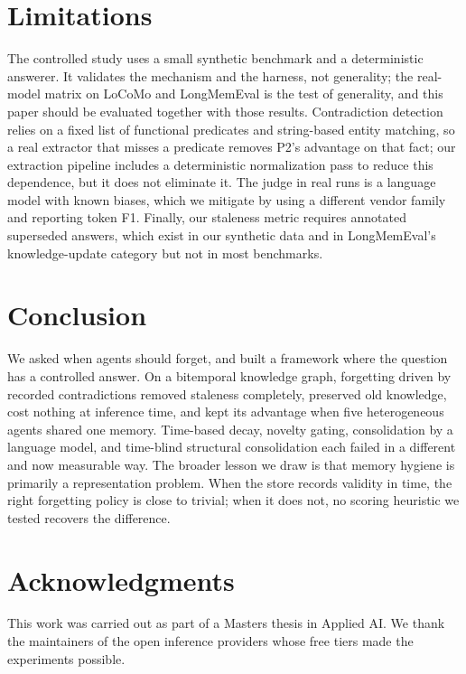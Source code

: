 \documentclass[letterpaper]{article} %
\begin{document}
\section{Limitations}

The controlled study uses a small synthetic benchmark and a deterministic answerer. It validates the mechanism and the harness, not generality; the real-model matrix on LoCoMo and LongMemEval is the test of generality, and this paper should be evaluated together with those results. Contradiction detection relies on a fixed list of functional predicates and string-based entity matching, so a real extractor that misses a predicate removes P2's advantage on that fact; our extraction pipeline includes a deterministic normalization pass to reduce this dependence, but it does not eliminate it. The judge in real runs is a language model with known biases, which we mitigate by using a different vendor family and reporting token F1. Finally, our staleness metric requires annotated superseded answers, which exist in our synthetic data and in LongMemEval's knowledge-update category but not in most benchmarks.

\section{Conclusion}

We asked when agents should forget, and built a framework where the question has a controlled answer. On a bitemporal knowledge graph, forgetting driven by recorded contradictions removed staleness completely, preserved old knowledge, cost nothing at inference time, and kept its advantage when five heterogeneous agents shared one memory. Time-based decay, novelty gating, consolidation by a language model, and time-blind structural consolidation each failed in a different and now measurable way. The broader lesson we draw is that memory hygiene is primarily a representation problem. When the store records validity in time, the right forgetting policy is close to trivial; when it does not, no scoring heuristic we tested recovers the difference.

\section{Acknowledgments}

This work was carried out as part of a Masters thesis in Applied AI. We thank the maintainers of the open inference providers whose free tiers made the experiments possible.


\end{document}
